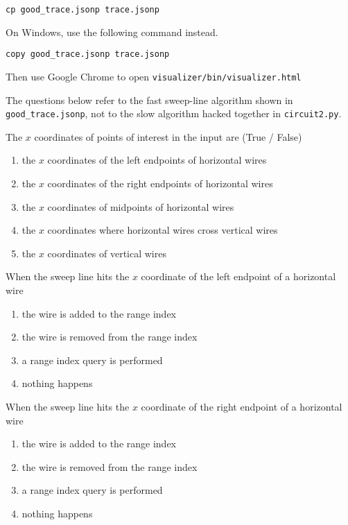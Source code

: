 \documentclass[12pt,twoside]{article}
\begin{document}
\begin{problems}
\texttt{cp good\_trace.jsonp trace.jsonp}

On Windows, use the following command instead.

\texttt{copy good\_trace.jsonp trace.jsonp}

Then use Google Chrome to open \texttt{visualizer/bin/visualizer.html}

The questions below refer to the fast sweep-line algorithm shown in
\texttt{good\_trace.jsonp}, not to the slow algorithm hacked together in
\texttt{circuit2.py}.

\begin{problemparts}
\problempart {} The $x$ coordinates of points of interest in the input
are (True / False)
\begin{enumerate}
  \item the $x$ coordinates of the left endpoints of horizontal wires
  \item the $x$ coordinates of the right endpoints of horizontal wires
  \item the $x$ coordinates of midpoints of horizontal wires
  \item the $x$ coordinates where horizontal wires cross vertical wires
  \item the $x$ coordinates of vertical wires
\end{enumerate}

\problempart {} When the sweep line hits the $x$ coordinate of the left
endpoint of a horizontal wire
\begin{enumerate}
  \item the wire is added to the range index
  \item the wire is removed from the range index
  \item a range index query is performed
  \item nothing happens
\end{enumerate}

\problempart {} When the sweep line hits the $x$ coordinate of the right
endpoint of a horizontal wire
\begin{enumerate}
  \item the wire is added to the range index
  \item the wire is removed from the range index
  \item a range index query is performed
  \item nothing happens
\end{enumerate}


\end{problemparts}
\end{problems}
\end{document}
